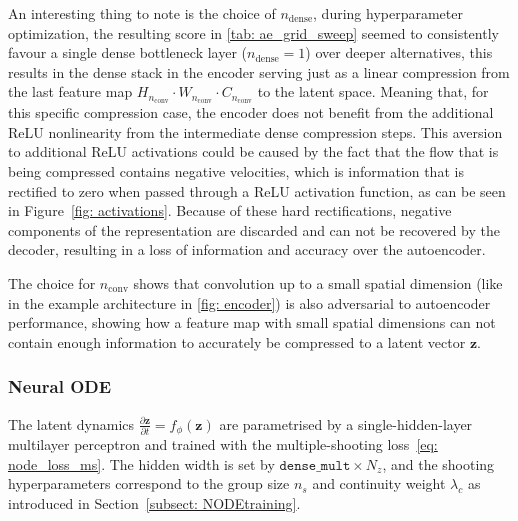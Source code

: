 An interesting thing to note is the choice of $n_\text{dense}$, during hyperparameter optimization, the resulting score in \ref{tab: ae_grid_sweep} seemed to consistently favour a single dense bottleneck layer ($n_\text{dense}=1$) over deeper alternatives, this results in the dense stack in the encoder serving just as a linear compression from the last feature map $H_{n_\text{conv}}\!\cdot\!W_{n_\text{conv}}\!\cdot\!C_{n_\text{conv}}$ to the latent space. Meaning that, for this specific compression case, the encoder does not benefit from the additional ReLU nonlinearity from the intermediate dense compression steps. This aversion to additional ReLU activations could be caused by the fact that the flow that is being compressed contains negative velocities, which is information that is rectified to zero when passed through a ReLU activation function, as can be seen in Figure~\ref{fig: activations}. Because of these hard rectifications, negative components of the representation are discarded and can not be recovered by the decoder, resulting in a loss of information and accuracy over the autoencoder. 


The choice for $n_\text{conv}$ shows that convolution up to a small spatial dimension (like in the example architecture in \ref{fig: encoder}) is also adversarial to autoencoder performance, showing how a feature map with small spatial dimensions can not contain enough information to accurately be compressed to a latent vector $\mathbf{z}$. 


\subsubsection{Neural ODE}
\label{subsubsect: 4_baseline_node}

The latent dynamics $\frac{\partial{\mathbf{z}}}{\partial t} = f_\phi(\mathbf{z})$ are parametrised by a single-hidden-layer multilayer perceptron and trained with the multiple-shooting loss~\eqref{eq: node_loss_ms}. The hidden width is set by $\texttt{dense\_mult}\times N_z$, and the shooting hyperparameters correspond to the group size $n_s$ and continuity weight $\lambda_c$ as introduced in Section~\ref{subsect: NODEtraining}. 

